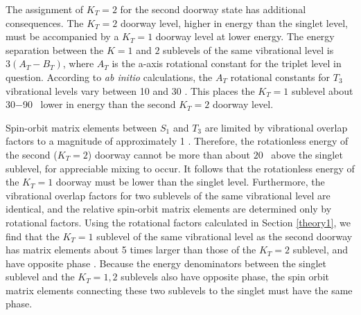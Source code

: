 The assignment of $K_T=2$ for the second doorway state has additional
consequences.  The $K_T=2$ doorway level, higher in energy than the
singlet level, must be accompanied by a $K_T=1$ doorway level at lower
energy.  %
The energy separation
between the $K=1$ and $2$ sublevels of the same vibrational level is
$3(A_T-B_T)$, where $A_T$ is the a-axis rotational constant for the
triplet level in question.  According to \emph{ab initio}
calculations, the $A_T$ rotational constants for $T_3$ vibrational
levels vary between 10 and 30 \rcm \cite{thom07}.  This places the
$K_T=1$ sublevel about 30$-$90 \rcm\ lower in energy than the second
$K_T=2$ doorway level.




Spin-orbit matrix elements between $S_1$ and $T_3$ are limited by
vibrational overlap factors to a magnitude of approximately 1 \rcm.
Therefore, the rotationless energy of the second ($K_T=2$) doorway
cannot be more than about $20$ \rcm\ above the singlet sublevel, for
appreciable mixing to occur.  It follows that the rotationless energy
of the $K_T=1$ doorway must be lower than the singlet level.
Furthermore, the vibrational overlap factors for two sublevels of the
same vibrational level are identical, and the relative spin-orbit
matrix elements are determined only by rotational factors.  Using the
rotational factors calculated in Section \ref{theory1}, we find that
the $K_T=1$ sublevel of the same vibrational level as the second
doorway has matrix elements about 5 times larger than those of the
$K_T=2$ sublevel, and have opposite phase \cite{stevens73}.  Because
the energy denominators between the singlet sublevel and the $K_T=1,2$
sublevels also have opposite phase, the spin orbit matrix elements
connecting these two sublevels to the singlet must have the same
phase.

